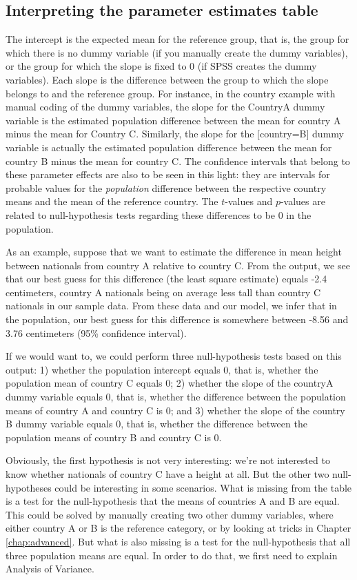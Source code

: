 \documentclass[]{book}\usepackage[]{graphicx}\usepackage[]{color}
\begin{document}
\subsection{Interpreting the parameter estimates table}

The intercept is the expected mean for the reference group, that is, the group for which there is no dummy variable (if you manually create the dummy variables), or the group for which the slope is fixed to 0 (if SPSS creates the dummy variables). Each slope is the difference between the group to which the slope belongs to and the reference group. For instance, in the country example with manual coding of the dummy variables, the slope for the CountryA dummy variable is the estimated population difference between the mean for country A minus the mean for Country C. Similarly, the slope for the [country=B] dummy variable is actually the estimated population difference between the mean for country B minus the mean for country C. The confidence intervals that belong to these parameter effects are also to be seen in this light: they are intervals for probable values for the \textit{population} difference between the respective country means and the mean of the reference country. The $t$-values and $p$-values are related to null-hypothesis tests regarding these differences to be 0 in the population. 

As an example, suppose that we want to estimate the difference in mean height between nationals from country A relative to country C. From the output, we see that our best guess for this difference (the least square estimate) equals -2.4 centimeters, country A nationals being on average less tall than country C nationals in our sample data. From these data and our model, we infer that in the population, our best guess for this difference is somewhere between -8.56 and 3.76 centimeters (95\% confidence interval). 

If we would want to, we could perform three null-hypothesis tests based on this output: 1) whether the population intercept equals 0, that is, whether the population mean of country C equals 0; 2) whether the slope of the countryA dummy variable equals 0, that is, whether the difference between the population means of country A and country C is 0; and 3) whether the slope of the country B dummy variable equals 0, that is, whether the difference between the population means of country B and country C is 0. 

Obviously, the first hypothesis is not very interesting: we're not interested to know whether nationals of country C have a height at all. But the other two null-hypotheses could be interesting in some scenarios. What is missing from the table is a test for the null-hypothesis that the means of countries A and B are equal. This could be solved by manually creating two other dummy variables, where either country A or B is the reference category, or by looking at tricks in Chapter \ref{chap:advanced}. But what is also missing is a test for the null-hypothesis that all three population means are equal. In order to do that, we first need to explain Analysis of Variance. 
\end{document}
